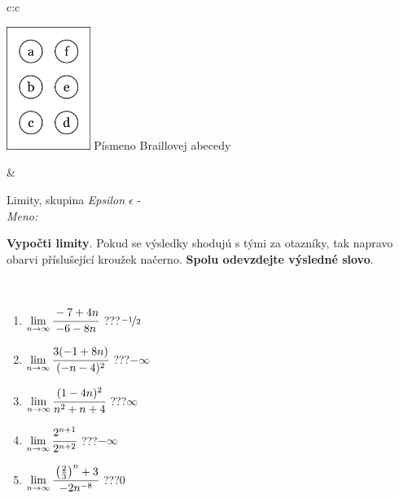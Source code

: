 \documentclass[10pt]{report}
\begin{document}
\begin{tabular}{c:c}
\begin{minipage}[c][104.5mm][t]{0.5\linewidth}
\begin{center}
\begin{minipage}{0.20\linewidth}
\begin{center}
\includegraphics[height=40mm]{../images/braille.png}
{\small Písmeno Braillovej abecedy}
\end{center}
\end{minipage}
\end{center}
\end{minipage}
&
\begin{minipage}[c][104.5mm][t]{0.5\linewidth}
\begin{center}
\vspace{7mm}
{\huge Limity, skupina \textit{Epsilon $\epsilon$} -}\\[5mm]
\textit{Meno:}\phantom{xxxxxxxxxxxxxxxxxxxxxxxxxxxxxxxxxxxxxxxxxxxxxxxxxxxxxxxxxxxxxxxxx}\\[5mm]
\begin{minipage}{0.95\linewidth}
\begin{center}
\textbf{Vypočti limity}. Pokud se výsledky shodujú s tými za otazníky, tak napravo\\obarvi příslušející kroužek načerno. \textbf{Spolu odevzdejte výsledné slovo}.
\end{center}
\end{minipage}
\\[1mm]
\begin{minipage}{0.79\linewidth}
\begin{center}
\begin{varwidth}{\linewidth}
\begin{enumerate}
\normalsize
\item $\lim\limits_{n\to\infty}\cfrac{-7+4n}{-6-8n}$\quad \dotfill\; ???\;\dotfill \quad $\nicefrac{-1}{2}$
\item $\lim\limits_{n\to\infty}\cfrac{3(-1+8n)}{(-n-4)^2}$\quad \dotfill\; ???\;\dotfill \quad $-\infty$
\item $\lim\limits_{n\to\infty}\cfrac{(1-4n)^2}{n^2+n+4}$\quad \dotfill\; ???\;\dotfill \quad $\infty$
\item $\lim\limits_{n\to\infty}\cfrac{2^{n+1}}{2^{n+2}}$\quad \dotfill\; ???\;\dotfill \quad $-\infty$
\item $\lim\limits_{n\to\infty}\cfrac{\left(\frac{2}{3}\right)^n +3}{-2n^{-8}}$\quad \dotfill\; ???\;\dotfill \quad $0$

\end{enumerate}
\end{varwidth}
\end{center}
\end{minipage}
\end{center}
\end{minipage}
\end{tabular}
\end{document}
